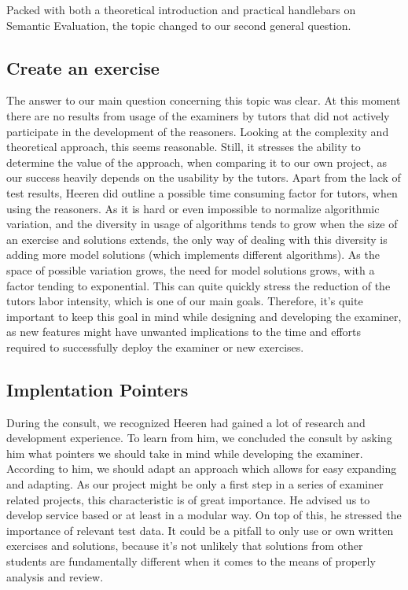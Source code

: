 Packed with both a theoretical introduction and practical handlebars on
Semantic Evaluation, the topic changed to our second general question.

\subsection{Create an exercise}
The answer to our main question concerning this topic was clear. At this moment
there are no results from usage of the examiners by tutors that did not
actively participate in the development of the reasoners. Looking at the 
complexity and theoretical approach, this seems reasonable. Still, it stresses
the ability to determine the value of the approach, when comparing it to our 
own project, as our success heavily depends on the usability by the tutors. 
Apart from the lack of test results, Heeren did outline a possible time
consuming factor for tutors, when using the reasoners. As it is hard or even 
impossible to normalize algorithmic variation, and the diversity in usage of 
algorithms tends to grow when the size of an exercise and solutions extends, 
the only way of dealing with this diversity is adding more model solutions 
(which implements different algorithms). 
As the space of possible variation grows, the need
for model solutions grows, with a factor tending to exponential. This can 
quite quickly stress the reduction of the tutors labor intensity, which is one 
of our main goals. Therefore, it's quite important to keep this goal in mind
while designing and developing the examiner, as new features might have 
unwanted implications to the time and efforts required to successfully deploy 
the \gls{examiner} or new \glspl{exercise}.

\subsection{Implentation Pointers}
During the consult, we recognized Heeren had gained a lot of research and 
development experience. To learn from him, we concluded the consult by 
asking him what pointers we should take in mind while developing the 
\gls{examiner}. According to him, we should adapt an approach which allows for 
easy expanding and adapting. As our project might be only a first step in a
series of \gls{examiner} related projects, this characteristic is of great 
importance. He advised us to develop service based or at least in a modular 
way. On top of this, he stressed the importance of relevant test data. It
could be a pitfall to only use or own written exercises and solutions, because
it's not unlikely that solutions from other students are fundamentally 
different when it comes to the means of properly analysis and review.

